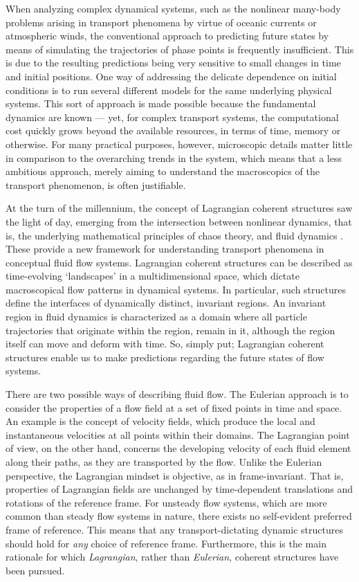 When analyzing complex dynamical systems, such as the nonlinear many-body
problems arising in transport phenomena by virtue of oceanic currents or
atmospheric winds, the conventional approach to predicting future states
by means of simulating the trajectories of phase points is frequently
insufficient. This is due to the resulting predictions being very sensitive to
small changes in time and initial positions. One way of addressing the delicate
dependence on initial conditions is to run several different models for the same
underlying physical systems. This sort of approach is made possible because
the fundamental dynamics are known --- yet, for complex transport systems,
the computational cost quickly grows beyond the available resources, in terms
of time, memory or otherwise. For many practical purposes, however, microscopic
details matter little in comparison to the overarching trends in the system,
which means that a less ambitious approach, merely aiming to understand the
macroscopics of the transport phenomenon, is often justifiable.

At the turn of the millennium, the concept of Lagrangian coherent structures
saw the light of day, emerging from the intersection between nonlinear dynamics,
that is, the underlying mathematical principles of chaos theory, and fluid
dynamics \parencite{haller2000lagrangian}. These provide a new framework for
understanding transport phenomena in conceptual fluid flow systems. Lagrangian
coherent structures can be described as time-evolving `landscapes' in a
multidimensional space, which dictate macroscopical flow patterns in dynamical
systems. In particular, such structures define the interfaces of dynamically
distinct, invariant regions. An invariant region in fluid dynamics is
characterized as a domain where all particle trajectories that originate within
the region, remain in it, although the region itself can move and deform with
time. So, simply put; Lagrangian coherent structures enable us to make
predictions regarding the future states of flow systems.

There are two possible ways of describing fluid flow. The Eulerian approach
is to consider the properties of a flow field at a set of fixed points in time
and space. An example is the concept of velocity fields, which produce the
local and instantaneous velocities at all points within their domains. The
Lagrangian point of view, on the other hand, concerns the developing velocity
of each fluid element along their paths, as they are transported by the flow.
Unlike the Eulerian perspective, the Lagrangian mindset is objective, as in
frame-invariant. That is, properties of Lagrangian fields are unchanged by
time-dependent translations and rotations of the reference frame. For unsteady
flow systems, which are more common than steady flow systems in nature, there
exists no self-evident preferred frame of reference. This means that any
transport-dictating dynamic structures should hold for \emph{any} choice of
reference frame. Furthermore, this is the main rationale for which
\emph{Lagrangian}, rather than \emph{Eulerian}, coherent structures have been
pursued.

